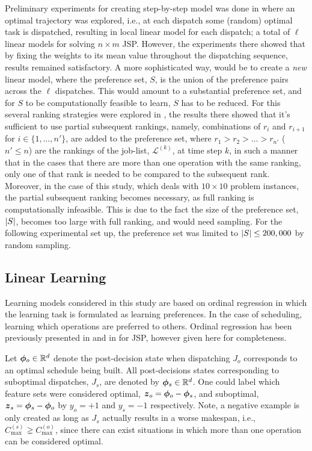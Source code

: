 \documentclass[smallextended]{svjour3}
\begin{document}
Preliminary experiments for creating step-by-step model was done in 
\cite{InRu11a} where an optimal trajectory was explored, i.e., at each dispatch 
some (random) optimal task is dispatched, resulting in local linear model for 
each dispatch; a total of $\ell$ linear models for solving $n\times m$ JSP. 
However, the experiments there showed that by fixing the weights to its mean 
value throughout the dispatching sequence, results remained satisfactory.
A more sophisticated way, would be to create a \emph{new} linear model, where 
the preference set, $S$, is the union of the preference pairs across the $\ell$ 
dispatches. 
This would amount to a substantial preference set, and for $S$ to be 
computationally feasible to learn, $S$ has to be reduced. For this several 
ranking strategies were explored in \cite{InRu15a}, the results there showed 
that it's sufficient to use partial subsequent rankings, namely, combinations 
of $r_i$ and $r_{i+1}$ for $i\in\{1,\ldots,n'\}$, are added to the preference 
set, where $r_1>r_2>\ldots>r_{n'}$ ($n'\leq n$) are the rankings of the 
job-list, $\mathcal{L}^{(k)}$, at time step $k$, in such a manner that in the 
cases that there are more than one operation with the same ranking, only one of 
that rank is needed to be compared to the subsequent rank. 
Moreover, in the case of this study, which deals with $10\times 10$ problem 
instances, the partial subsequent ranking becomes necessary, as full ranking is 
computationally infeasible. This is due to the fact the size of the preference 
set, $\lvert S\rvert$, becomes too large with full ranking, and would need sampling.
For the following experimental set up, the preference set was limited to 
$\lvert S\rvert\leq200,000$ by random sampling.

\subsection{Linear Learning}\label{sec:liblinear}

Learning models considered in this study are based on ordinal regression in 
which the learning task is formulated as learning preferences. In the case of 
scheduling, learning which operations are preferred to others. Ordinal 
regression has been previously presented in \cite{Ru06:PPSN} and in 
\cite{InRu11a} for JSP, however given here for completeness. 

Let $\bm{\phi}_{o}\in{\mathbb R}^d$ denote the post-decision state when dispatching $J_o$ 
corresponds to an optimal schedule being built. All post-decisions states 
corresponding to suboptimal dispatches, $J_s$, are denoted by 
$\bm{\phi}_{s}\in{\mathbb R}^d$. One could label which feature sets were considered optimal, 
$\vec{z}_{o}=\vphi_{o}-\vphi_{s}$, and suboptimal, 
$\vec{z}_{s}=\vphi_{s}-\vphi_{o}$ by $y_o=+1$ and $y_s=-1$ respectively. 
Note, a negative example is only created as long as $J_s$ actually results in a 
worse makespan, i.e., $C_{\max}^{(s)}\gneq C_{\max}^{(o)}$, since there can 
exist situations in which more than one operation can be considered optimal.
\end{document}
